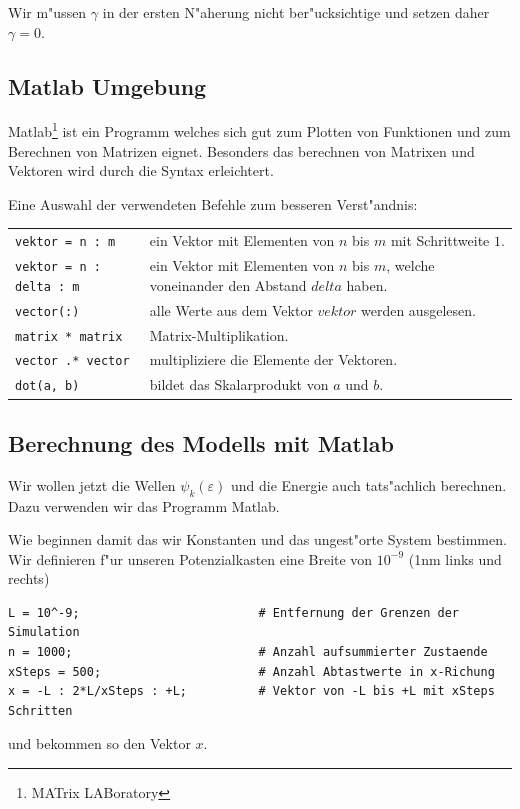 \begin{refsection}
Wir m"ussen $\gamma$ in der ersten N"aherung nicht ber"ucksichtige und setzen daher $\gamma = 0$.




\subsection{Matlab Umgebung}

Matlab\footnote{MATrix LABoratory} ist ein Programm welches sich gut zum Plotten von Funktionen
und zum Berechnen von Matrizen eignet.
Besonders das berechnen von Matrixen und Vektoren wird durch die Syntax erleichtert.

Eine Auswahl der verwendeten Befehle zum besseren Verst"andnis:

\begin{center}
	\begin{tabular}{lp{9cm}}
		\verb|vektor = n : m| & ein Vektor mit Elementen von $n$ bis $m$ mit Schrittweite $1$. \\
		\verb|vektor = n : delta : m| & ein Vektor mit Elementen von $n$ bis $m$, welche voneinander den Abstand $delta$ haben. \\
		\verb|vector(:)| & alle Werte aus dem Vektor $vektor$ werden ausgelesen. \\
		\verb|matrix * matrix| & Matrix-Multiplikation. \\
		\verb|vector .* vector| & multipliziere die Elemente der Vektoren. \\
		\verb|dot(a, b)| & bildet das Skalarprodukt von $a$ und $b$.
	\end{tabular}
\end{center}




\subsection{Berechnung des Modells mit Matlab}

Wir wollen jetzt die Wellen $\psi_k(\varepsilon)$ und die Energie auch tats"achlich berechnen.
Dazu verwenden wir das Programm Matlab.

Wie beginnen damit das wir Konstanten und das ungest"orte System bestimmen.
Wir definieren f"ur unseren Potenzialkasten eine Breite von $10^{-9}$ (1nm links und rechts)
\begin{lstlisting}[style=Matlab]
L = 10^-9;                         # Entfernung der Grenzen der Simulation
n = 1000;                          # Anzahl aufsummierter Zustaende
xSteps = 500;                      # Anzahl Abtastwerte in x-Richung
x = -L : 2*L/xSteps : +L;          # Vektor von -L bis +L mit xSteps Schritten
\end{lstlisting}
und bekommen so den Vektor $x$.


\end{refsection}
